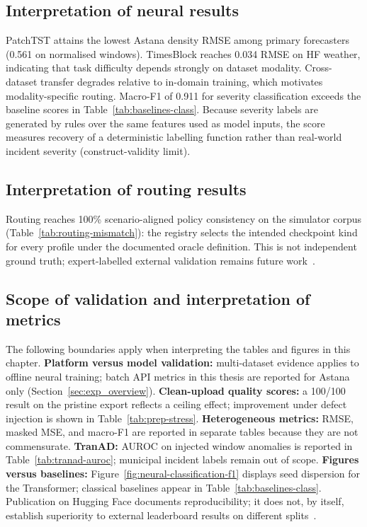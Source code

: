 \subsection{Interpretation of neural results}

PatchTST attains the lowest Astana density RMSE among primary forecasters (0.561 on normalised windows). TimesBlock reaches 0.034 RMSE on HF weather, indicating that task difficulty depends strongly on dataset modality. Cross-dataset transfer degrades relative to in-domain training, which motivates modality-specific routing. Macro-F1 of 0.911 for severity classification exceeds the baseline scores in Table~\ref{tab:baselines-class}. Because severity labels are generated by rules over the same features used as model inputs, the score measures recovery of a deterministic labelling function rather than real-world incident severity (construct-validity limit).

\subsection{Interpretation of routing results}

Routing reaches 100\% scenario-aligned policy consistency on the simulator corpus (Table~\ref{tab:routing-mismatch}): the registry selects the intended checkpoint kind for every profile under the documented oracle definition. This is not independent ground truth; expert-labelled external validation remains future work~\cite{bakytuly2026microservices}.

\subsection{Scope of validation and interpretation of metrics}

The following boundaries apply when interpreting the tables and figures in this chapter. \textbf{Platform versus model validation:} multi-dataset evidence applies to offline neural training; batch API metrics in this thesis are reported for Astana only (Section~\ref{sec:exp_overview}). \textbf{Clean-upload quality scores:} a 100/100 result on the pristine export reflects a ceiling effect; improvement under defect injection is shown in Table~\ref{tab:prep-stress}. \textbf{Heterogeneous metrics:} RMSE, masked MSE, and macro-F1 are reported in separate tables because they are not commensurate. \textbf{TranAD:} AUROC on injected window anomalies is reported in Table~\ref{tab:tranad-auroc}; municipal incident labels remain out of scope. \textbf{Figures versus baselines:} Figure~\ref{fig:neural-classification-f1} displays seed dispersion for the Transformer; classical baselines appear in Table~\ref{tab:baselines-class}. Publication on Hugging Face documents reproducibility; it does not, by itself, establish superiority to external leaderboard results on different splits~\cite{nie2023patchtst,yu2018stgcn}.

